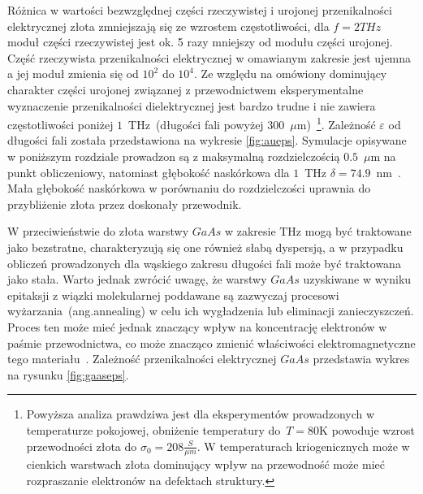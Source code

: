 Różnica w wartości bezwzględnej części rzeczywistej i urojonej przenikalności elektrycznej złota zmniejszają się ze wzrostem częstotliwości, dla $f=2THz$ moduł części rzeczywistej jest ok. 5 razy mniejszy od modułu części urojonej. Część rzeczywista przenikalności elektrycznej w omawianym zakresie jest ujemna a jej moduł zmienia się od $10^2$ do $10^4$. Ze względu na omówiony dominujący charakter części urojonej związanej z przewodnictwem eksperymentalne wyznaczenie przenikalności dielektrycznej jest bardzo trudne i nie zawiera częstotliwości poniżej $1$~THz~(długości fali powyżej $300$~$\mu$m)~\cite{ordal1983optical}\footnote{Powyższa analiza prawdziwa jest dla eksperymentów prowadzonych w temperaturze pokojowej, obniżenie temperatury do~$T=$80K powoduje wzrost przewodności złota do $\sigma_0=208\frac{S}{\mu m}$. W temperaturach kriogenicznych może w cienkich warstwach złota dominujący wpływ na przewodność może mieć rozpraszanie elektronów na defektach struktury.\cite{lide2009crc}}. Zależność $\varepsilon$ od długości fali została przedstawiona na wykresie \ref{fig:aueps}. Symulacje opisywane w poniższym rozdziale prowadzon są z maksymalną rozdzielczością $0.5$~$\mu$m na punkt obliczeniowy, natomiast głębokość naskórkowa dla $1$~THz $\delta=74.9$~nm~\cite{lee2009principles}. Mała głębokość naskórkowa w porównaniu do rozdzielczości uprawnia do przybliżenie złota przez doskonały przewodnik. 

W przeciwieństwie do złota warstwy $GaAs$ w zakresie THz mogą być traktowane jako bezstratne, charakteryzują się one również słabą dyspersją, a w przypadku obliczeń prowadzonych dla wąskiego zakresu długości fali może być traktowana jako stała. Warto jednak zwrócić uwagę, że warstwy $GaAs$ uzyskiwane w wyniku epitaksji z wiązki molekularnej poddawane są zazwyczaj procesowi wyżarzania~(ang.annealing) w celu ich wygładzenia lub eliminacji zanieczyszczeń. Proces ten może mieć jednak znaczący wpływ na koncentrację elektronów w paśmie przewodnictwa, co może znacząco zmienić właściwości elektromagnetyczne tego materiału~\cite{zhang2009annealing}. Zależność przenikalności elektrycznej $GaAs$ przedstawia wykres na rysunku \ref{fig:gaaseps}.


